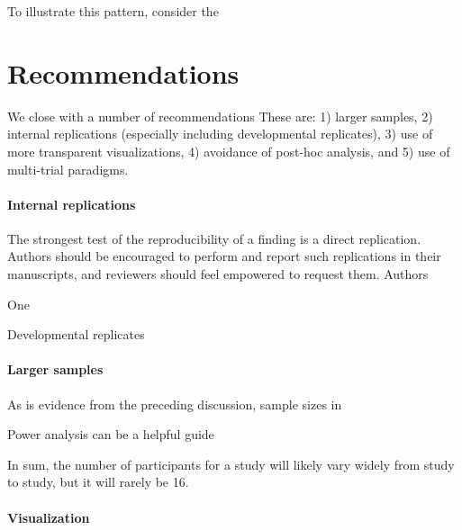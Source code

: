 \documentclass[man,noapacite]{apa2}
\begin{document}
To illustrate this pattern, consider the 

\section{Recommendations}

We close with a number of recommendations
These are: 1) larger samples, 2) internal replications (especially including developmental replicates), 3) use of more transparent visualizations, 4) avoidance of post-hoc analysis, and 5) use of multi-trial paradigms.

\paragraph{Internal replications}

The strongest test of the reproducibility of a finding is a direct replication. Authors should be encouraged to perform and report such replications in their manuscripts, and reviewers should feel empowered to request them. Authors

One 
 
Developmental replicates

\paragraph{Larger samples}

As is evidence from the preceding discussion, sample sizes in 

Power analysis can be a helpful guide

In sum, the number of participants for a study will likely vary widely from study to study, but it will rarely be 16. 



\paragraph{Visualization}
\end{document}
